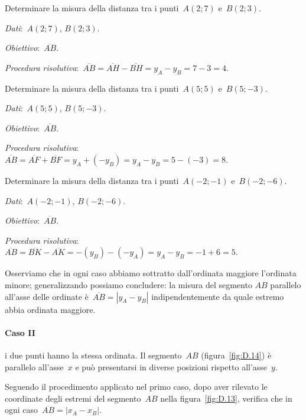 \begin{exrig}
 \begin{esempio}
Determinare la misura della distanza tra i punti~$A(2;7)$ e~$B(2;3)$.

\emph{Dati}:~$A(2;7)$, $B(2;3)$.

\emph{Obiettivo}:~$\overline{AB}$.

\emph{Procedura risolutiva}:~$\overline{AB}=\overline{AH}-\overline{BH}=y_{A}-y_{B}=7-3=4$.

 \end{esempio}
 \begin{esempio}
 \label{ex:D.16}
Determinare la misura della distanza tra i punti~$A(5;5)$ e~$B(5;-3)$.

\emph{Dati}:~$A(5;5)$, $B(5;-3)$.

\emph{Obiettivo}:~$\overline{AB}$.

\emph{Procedura risolutiva}:~$\overline{AB}=\overline{AF}+\overline{BF}=y_{A}+(-y_{B})=y_{A}-y_{B}=5-(-3)=8$.

 \end{esempio}
 \begin{esempio}
Determinare la misura della distanza tra i punti~$A(-2;-1)$ e~$B(-2;-6)$.

\emph{Dati}:~$A(-2;-1)$, $B(-2;-6)$.

\emph{Obiettivo}:~$\overline{AB}$.

\emph{Procedura risolutiva}:~$\overline{AB}=\overline{BK}-\overline{AK}=-(y_{B})-(-y_{A})=y_{A}-y_{B}=-1+6=5$.

 \end{esempio}
\end{exrig}
Osserviamo che in ogni caso abbiamo sottratto dall'ordinata maggiore l'ordinata minore; generalizzando possiamo concludere:
la misura del segmento $AB$ parallelo all'asse delle ordinate è~$\overline{AB}=|y_{A}-y_{B}|$
indipendentemente da quale estremo abbia ordinata maggiore.

\paragraph{Caso II} i due punti hanno la stessa ordinata. Il segmento~$AB$ (figura~\ref{fig:D.14}) è parallelo all'asse~$x$ e
può presentarsi in diverse posizioni rispetto all'asse~$y$.

Seguendo il procedimento applicato nel primo caso, dopo aver rilevato le coordinate degli estremi del segmento~$AB$
nella figura~\ref{fig:D.13}, verifica che in ogni caso~$\overline{AB}=|x_{A}-x_{B}|$.

